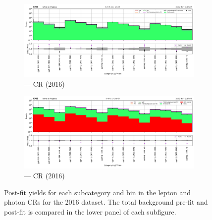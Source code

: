 \begin{figure}[htbp]
    \begin{subfigure}[b]{0.66\textwidth}
        \includegraphics[width=\textwidth]{chapters/higgstoinv/figures/mountain_ranges/2016/ggF/Zee_tree_fit_s-abs_values_ggF_cats.pdf}
        \caption{\ggH --- \doubleEleCr \gls{CR} (2016)}
    \end{subfigure}

    \begin{subfigure}[b]{0.66\textwidth}
        \includegraphics[width=\textwidth]{chapters/higgstoinv/figures/mountain_ranges/2016/ggF/Photon_tree_fit_s-abs_values_ggF_cats.pdf}
        \caption{\ggH --- \singlePhotonCr \gls{CR} (2016)}
    \end{subfigure}
    \caption[Post-fit yields for each \ggH subcategory and \ptmiss bin in the lepton and photon control regions for the 2016 dataset]{Post-fit yields for each \ggH subcategory and \ptmiss bin in the lepton and photon \glspl{CR} for the 2016 dataset. The total background pre-fit and post-fit is compared in the lower panel of each subfigure.}
    \label{fig:htoinv_mountain_range_ggF_2016_CRs}
\end{figure}

